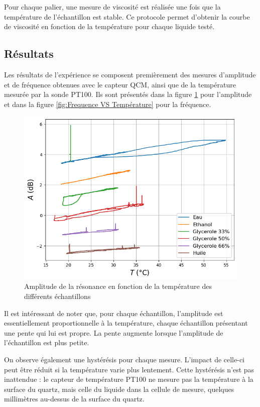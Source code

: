 Pour chaque palier, une mesure de viscosité est réalisée une fois que la température de l'échantillon est stable. Ce protocole permet d'obtenir la courbe de viscosité en fonction de la température pour chaque liquide testé.

\subsection{Résultats}

Les résultats de l'expérience se composent premièrement des mesures d'amplitude et de fréquence obtenues avec le capteur QCM, ainsi que de la température mesurée par la sonde PT100.  
Ils sont présentés dans la figure \ref{fig:Amplitude VS Température} pour l'amplitude et dans la figure \ref{fig:Frequence VS Température} pour la fréquence.

\begin{figure}[H]
    \centering
    \includegraphics[width=\textwidth]{assets/figures/Amplitude-Temperature.png}
    \caption{Amplitude de la résonance en fonction de la température des différents échantillons}
    \label{fig:Amplitude VS Température}
\end{figure}

Il est intéressant de noter que, pour chaque échantillon, l'amplitude est essentiellement proportionnelle à la température, chaque échantillon présentant une pente qui lui est propre.  
La pente augmente lorsque l'amplitude de l'échantillon est plus petite.

On observe également une hystérésis pour chaque mesure. L'impact de celle-ci peut être réduit si la température varie plus lentement.  
Cette hystérésis n'est pas inattendue : le capteur de température PT100 ne mesure pas la température à la surface du quartz, mais celle du liquide dans la cellule de mesure, quelques millimètres au-dessus de la surface du quartz.

